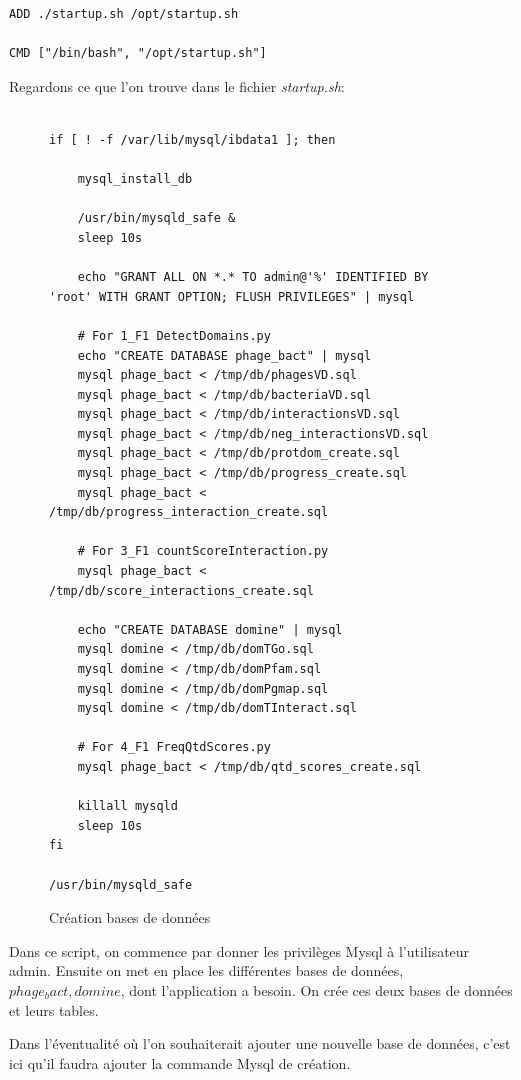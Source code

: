 \begin{lstlisting}[frame=single]
ADD ./startup.sh /opt/startup.sh

CMD ["/bin/bash", "/opt/startup.sh"]
\end{lstlisting}

Regardons ce que l'on trouve dans le fichier \emph{startup.sh}:

\begin{figure}[H] 
\centering 
\begin{lstlisting}[frame=single]

if [ ! -f /var/lib/mysql/ibdata1 ]; then

	mysql_install_db

	/usr/bin/mysqld_safe &
	sleep 10s

	echo "GRANT ALL ON *.* TO admin@'%' IDENTIFIED BY 'root' WITH GRANT OPTION; FLUSH PRIVILEGES" | mysql

	# For 1_F1 DetectDomains.py
	echo "CREATE DATABASE phage_bact" | mysql
	mysql phage_bact < /tmp/db/phagesVD.sql
	mysql phage_bact < /tmp/db/bacteriaVD.sql
	mysql phage_bact < /tmp/db/interactionsVD.sql
	mysql phage_bact < /tmp/db/neg_interactionsVD.sql
	mysql phage_bact < /tmp/db/protdom_create.sql
	mysql phage_bact < /tmp/db/progress_create.sql
	mysql phage_bact < /tmp/db/progress_interaction_create.sql

    # For 3_F1 countScoreInteraction.py
	mysql phage_bact < /tmp/db/score_interactions_create.sql

	echo "CREATE DATABASE domine" | mysql
    mysql domine < /tmp/db/domTGo.sql
    mysql domine < /tmp/db/domPfam.sql
    mysql domine < /tmp/db/domPgmap.sql
    mysql domine < /tmp/db/domTInteract.sql

    # For 4_F1 FreqQtdScores.py
	mysql phage_bact < /tmp/db/qtd_scores_create.sql

	killall mysqld
	sleep 10s
fi

/usr/bin/mysqld_safe
\end{lstlisting}
\caption[Création bases de données]{Création bases de données}
\label{fig:createDb} 
\end{figure}

Dans ce script, on commence par donner les privilèges Mysql à l'utilisateur admin. Ensuite on met en place les différentes bases de données, \emph{$phage_bact, domine$}, dont l'application a besoin. On crée ces deux bases de données et leurs tables.

Dans l'éventualité où l'on souhaiterait ajouter une nouvelle base de données, c'est ici qu'il faudra ajouter la commande Mysql de création.

